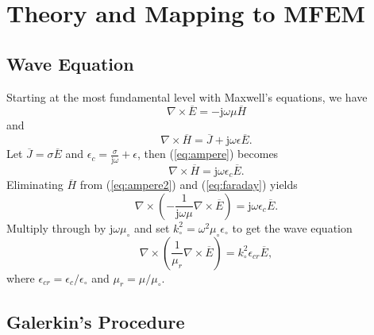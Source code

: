 \documentclass[titlepage]{article}
\renewcommand\_{\textunderscore\linebreak[1]}
\begin{document}
\section{Theory and Mapping to MFEM}

\subsection{Wave Equation}

Starting at the most fundamental level with Maxwell's equations, we have
\begin{equation}
\label{eq:faraday}
\nabla\times\overline{E}=-\text{j}\omega\mu\overline{H}
\end{equation}
and
\begin{equation}
\label{eq:ampere}
\nabla\times\overline{H}=\overline{J}+\text{j}\omega\epsilon\overline{E}.
\end{equation}
Let $\overline{J}=\sigma\overline{E}$ and $\epsilon_c=\frac{\sigma}{\text{j}\omega}+\epsilon$, then (\ref{eq:ampere}) becomes
\begin{equation}
\label{eq:ampere2}
\nabla\times\overline{H}=\text{j}\omega\epsilon_c\overline{E}.
\end{equation}
Eliminating $\overline{H}$ from (\ref{eq:ampere2}) and (\ref{eq:faraday}) yields 
\begin{equation}
\nabla\times(-\frac{1}{\text{j}\omega\mu}\nabla\times\overline{E})=\text{j}\omega\epsilon_c\overline{E}.
\end{equation}
Multiply through by $\text{j}\omega\mu_\circ$ and set $k_\circ^2=\omega^2\mu_\circ\epsilon_\circ$ to get the wave equation
\begin{equation}
\label{eq:wave_equation}
\nabla\times(\frac{1}{\mu_r}\nabla\times\overline{E})=k_\circ^2\epsilon_{cr}\overline{E},
\end{equation}
where $\epsilon_{cr}=\epsilon_c/\epsilon_\circ$ and $\mu_r=\mu/\mu_\circ$.

\subsection{Galerkin's Procedure}
\end{document}
